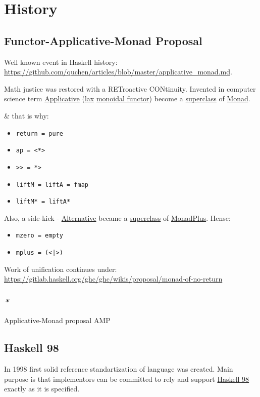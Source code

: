 \documentclass[a4paper,14pt,oneside]{book}
\begin{document}
\chapter{History}
\label{sec:org9feb55c}
\section{\label{orgbfbc3d2}Functor-Applicative-Monad Proposal}
\label{sec:orgb826126}
Well known event in Haskell history: \url{https://github.com/quchen/articles/blob/master/applicative\_monad.md}.

Math justice was restored with a RETroactive CONtinuity. Invented in computer science term \hyperref[org76264b5]{Applicative} (\hyperref[orgbdac3ed]{lax} \hyperref[orgc3d4a27]{monoidal functor}) become a \hyperref[org548ed54]{superclass} of \hyperref[org6ac963d]{Monad}.

\& that is why:
\begin{itemize}
\item \texttt{return = pure}
\item \texttt{ap = <*>}
\item \texttt{>> = *>}
\item \texttt{liftM = liftA = fmap}
\item \texttt{liftM* = liftA*}
\end{itemize}

Also, a side-kick - \hyperref[org6586d6e]{Alternative} became a \hyperref[org548ed54]{superclass} of \hyperref[orge710161]{MonadPlus}. Hense:
\begin{itemize}
\item \texttt{mzero = empty}
\item \texttt{mplus = (<|>)}
\end{itemize}

Work of unification continues under: \url{https://gitlab.haskell.org/ghc/ghc/wikis/proposal/monad-of-no-return}

\subsection{\emph{*}}
\label{sec:org44681a7}

\label{orgc4c45ee}Applicative-Monad proposal
\label{org494acb5}AMP

\section{\label{org79e8f00}Haskell 98}
\label{sec:orgfd3f6f0}
In 1998 first solid reference standartization of language was created. Main purpose is that implementors can be committed to rely and support \hyperref[org79e8f00]{Haskell 98} exactly as it is specified.
\end{document}
